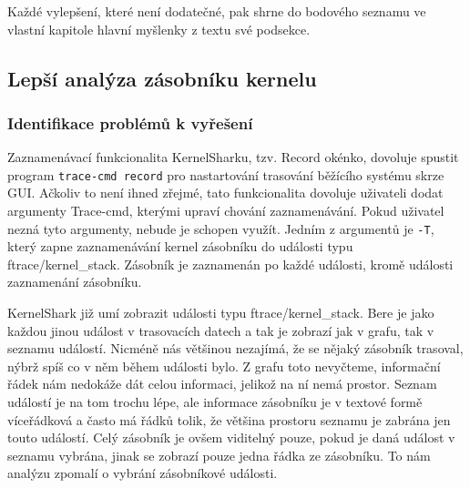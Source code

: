 Každé vylepšení, které není dodatečné, pak shrne do bodového seznamu ve vlastní kapitole hlavní myšlenky z textu své podsekce.

\subsection{Lepší analýza zásobníku kernelu}

\subsubsection*{Identifikace problémů k vyřešení}
Zaznamenávací funkcionalita KernelSharku, tzv. Record okénko, dovoluje spustit program \texttt{trace-cmd record} pro nastartování trasování běžícího systému skrze GUI. Ačkoliv to není ihned zřejmé, tato funkcionalita dovoluje uživateli dodat argumenty Trace-cmd, kterými upraví chování zaznamenávání. Pokud uživatel nezná tyto argumenty, nebude je schopen využít. Jedním z argumentů je \texttt{-T}, který zapne zaznamenávání kernel zásobníku do události typu ftrace/kernel\_stack. Zásobník je zaznamenán po každé události, kromě události zaznamenání zásobníku.

KernelShark již umí zobrazit události typu ftrace/kernel\_stack. Bere je jako každou jinou událost v trasovacích datech a tak je zobrazí jak v grafu, tak v seznamu událostí. Nicméně nás většinou nezajímá, že se nějaký zásobník trasoval, nýbrž spíš co v něm během události bylo. Z grafu toto nevyčteme, informační řádek nám nedokáže dát celou informaci, jelikož na ní nemá prostor. Seznam událostí je na tom trochu lépe, ale informace zásobníku je v textové formě víceřádková a často má řádků tolik, že většina prostoru seznamu je zabrána jen touto událostí. Celý zásobník je ovšem viditelný pouze, pokud je daná událost v seznamu vybrána, jinak se zobrazí pouze jedna řádka ze zásobníku. To nám analýzu zpomalí o vybrání zásobníkové události.

